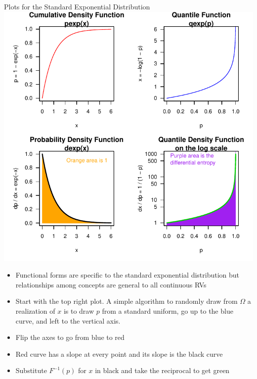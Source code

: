 \documentclass[
  ignorenonframetext,
]{beamer}
\providecommand{\tightlist}{%
  \setlength{\itemsep}{0pt}\setlength{\parskip}{0pt}}
\begin{document}
\begin{frame}{Plots for the Standard Exponential Distribution}
\protect\hypertarget{plots-for-the-standard-exponential-distribution}{}
\includegraphics{Slides04_files/figure-beamer/unnamed-chunk-3-1.pdf}

\begin{itemize}
\tightlist
\item
  Functional forms are specific to the standard exponential distribution
  but relationships among concepts are general to all continuous RVs
\end{itemize}

\begin{itemize}[<+->]
\tightlist
\item
  Start with the top right plot. A simple algorithm to randomly draw
  from \(\Omega\) a realization of \(x\) is to draw \(p\) from a
  standard uniform, go up to the blue curve, and left to the vertical
  axis.
\item
  Flip the axes to go from blue to red
\item
  Red curve has a slope at every point and its slope is the black curve
\item
  Substitute \(F^{-1}\left(p\right)\) for \(x\) in black and take the
  reciprocal to get green
\end{itemize}
\end{frame}
\end{document}
